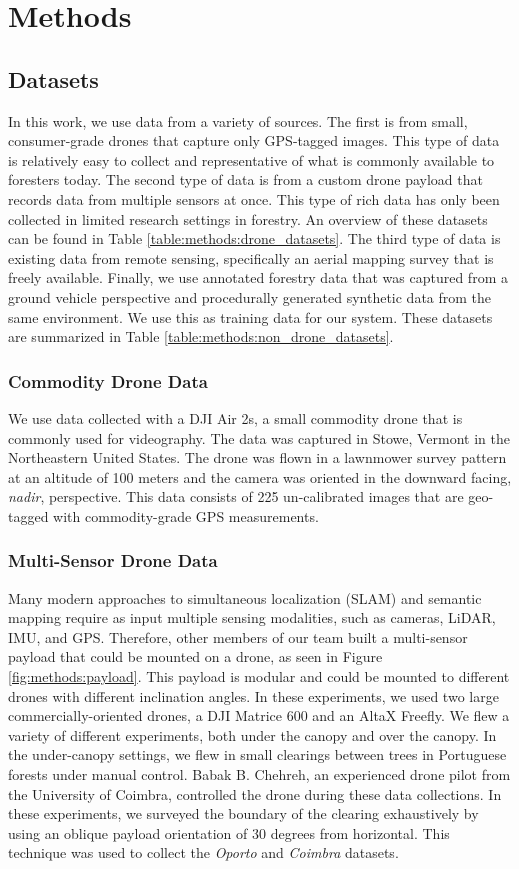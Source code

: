 \chapter{Methods} \label{chapMethod}
\section{Datasets}
In this work, we use data from a variety of sources. The first is from small, consumer-grade drones that capture only GPS-tagged images. This type of data is relatively easy to collect and representative of what is commonly available to foresters today. The second type of data is from a custom drone payload that records data from multiple sensors at once. This type of rich data has only been collected in limited research settings in forestry. An overview of these datasets can be found in Table \ref{table:methods:drone_datasets}. The third type of data is existing data from remote sensing, specifically an aerial mapping survey that is freely available. Finally, we use annotated forestry data that was captured from a ground vehicle perspective and procedurally generated synthetic data from the same environment. We use this as training data for our system. These datasets are summarized in Table \ref{table:methods:non_drone_datasets}.

\subsection{Commodity Drone Data}
We use data collected with a DJI Air 2s, a small commodity drone that is commonly used for videography. The data was captured in Stowe, Vermont in the Northeastern United States. The drone was flown in a lawnmower survey pattern at an altitude of 100 meters and the camera was oriented in the downward facing, \textit{nadir}, perspective. This data consists of 225 un-calibrated images that are geo-tagged with commodity-grade GPS measurements.

\subsection{Multi-Sensor Drone Data}
Many modern approaches to simultaneous localization (SLAM) and semantic mapping require as input multiple sensing modalities, such as cameras, LiDAR, IMU, and GPS. Therefore, other members of our team built a multi-sensor payload that could be mounted on a drone, as seen in Figure \ref{fig:methods:payload}. 
This payload is modular and could be mounted to different drones with different inclination angles. In these experiments, we used two large commercially-oriented drones, a DJI Matrice 600 and an AltaX Freefly. We flew a variety of different experiments, both under the canopy and over the canopy. In the under-canopy settings, we flew in small clearings between trees in Portuguese forests under manual control. Babak B. Chehreh, an experienced drone pilot from the University of Coimbra, controlled the drone during these data collections. In these experiments, we surveyed the boundary of the clearing exhaustively by using an oblique payload orientation of 30 degrees from horizontal. This technique was used to collect the \textit{Oporto} and \textit{Coimbra} datasets.

